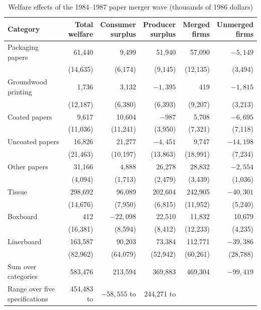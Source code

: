 \begin{table}[htbp]
\centering
\caption{Welfare effects of the 1984--1987 paper merger wave (thousands of 1986 dollars)}
\label{tab:11-pesendorfer}
\begin{threeparttable}
\small
\begin{tabular}{@{}lrrrrr@{}}
\toprule
Category & \makecell[r]{Total\\ welfare} & \makecell[r]{Consumer\\ surplus} & \makecell[r]{Producer\\ surplus} &
\makecell[r]{Merged\\ firms} & \makecell[r]{Unmerged\\ firms} \\
\midrule
Packaging papers & 61,440 & 9,499 & 51,940 & 57,090 & $-5{,}149$ \\
 & (14,635) & (6,174) & (9,145) & (12,135) & (3,494) \\
Groundwood printing & 1,736 & 3,132 & $-1{,}395$ & 419 & $-1{,}815$ \\
 & (12,187) & (6,380) & (6,393) & (9,207) & (3,213) \\
Coated papers & 9,617 & 10,604 & $-987$ & 5,708 & $-6{,}695$ \\
 & (11,036) & (11,241) & (3,950) & (7,321) & (7,118) \\
Uncoated papers & 16,826 & 21,277 & $-4{,}451$ & 9,747 & $-14{,}198$ \\
 & (21,463) & (10,197) & (13,863) & (18,991) & (7,234) \\
Other papers & 31,166 & 4,888 & 26,278 & 28,832 & $-2{,}554$ \\
 & (4,094) & (1,713) & (2,479) & (3,439) & (1,036) \\
Tissue & 298,692 & 96,089 & 202,604 & 242,905 & $-40{,}301$ \\
 & (14,676) & (7,950) & (6,815) & (11,952) & (5,240) \\
Boxboard & 412 & $-22{,}098$ & 22,510 & 11,832 & 10,679 \\
 & (16,381) & (8,594) & (8,412) & (12,233) & (4,235) \\
Linerboard & 163,587 & 90,203 & 73,384 & 112,771 & $-39{,}386$ \\
 & (82,962) & (64,079) & (52,942) & (60,261) & (28,788) \\
\midrule
Sum over categories & 583,476 & 213,594 & 369,883 & 469,304 & $-99{,}419$ \\
Range over five specifications & 454,483 to & $-58{,}555$ to & 244,271 to & & \\

\end{tabular}
\end{threeparttable}
\end{table}
